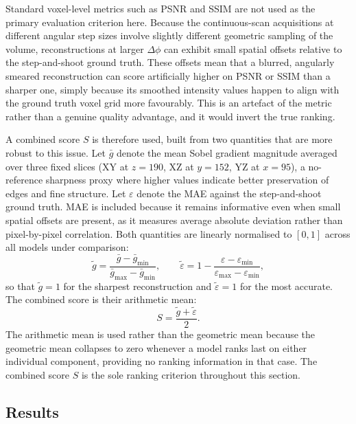 \documentclass[12pt, a4paper, twoside]{report}
\begin{document}
Standard voxel-level metrics such as PSNR and SSIM are not used as the primary evaluation criterion here. Because the continuous-scan acquisitions at different angular step sizes involve slightly different geometric sampling of the volume, reconstructions at larger $\Delta\phi$ can exhibit small spatial offsets relative to the step-and-shoot ground truth. These offsets mean that a blurred, angularly smeared reconstruction can score artificially higher on PSNR or SSIM than a sharper one, simply because its smoothed intensity values happen to align with the ground truth voxel grid more favourably. This is an artefact of the metric rather than a genuine quality advantage, and it would invert the true ranking.

A combined score $S$ is therefore used, built from two quantities that are more robust to this issue. Let $\bar{g}$ denote the mean Sobel gradient magnitude averaged over three fixed slices (XY at $z = 190$, XZ at $y = 152$, YZ at $x = 95$), a no-reference sharpness proxy where higher values indicate better preservation of edges and fine structure. Let $\varepsilon$ denote the MAE against the step-and-shoot ground truth. MAE is included because it remains informative even when small spatial offsets are present, as it measures average absolute deviation rather than pixel-by-pixel correlation. Both quantities are linearly normalised to $[0, 1]$ across all models under comparison:
%
\begin{equation}
    \tilde{g} = \frac{\bar{g} - \bar{g}_{\min}}{\bar{g}_{\max} - \bar{g}_{\min}}, \qquad
    \tilde{\varepsilon} = 1 - \frac{\varepsilon - \varepsilon_{\min}}{\varepsilon_{\max} - \varepsilon_{\min}},
    \label{eq:combined_norm}
\end{equation}
%
so that $\tilde{g} = 1$ for the sharpest reconstruction and $\tilde{\varepsilon} = 1$ for the most accurate. The combined score is their arithmetic mean:
%
\begin{equation}
    S = \frac{\tilde{g} + \tilde{\varepsilon}}{2}.
    \label{eq:combined_score}
\end{equation}
%
The arithmetic mean is used rather than the geometric mean because the geometric mean collapses to zero whenever a model ranks last on either individual component, providing no ranking information in that case. The combined score $S$ is the sole ranking criterion throughout this section.

\subsection{Results}
\label{subsec:cont_static_results}
\end{document}
